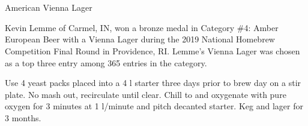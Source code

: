 \part{\styleviennalager}

\begin{recipie}{American Vienna Lager}

\begin{aboutblock}
Kevin Lemme of Carmel, IN, won a bronze medal in Category \#4: Amber European Beer with
a Vienna Lager during the 2019 National Homebrew Competition Final Round in Providence,
RI. Lemme's Vienna Lager was chosen as a top three entry among 365 entries in the category.
\end{aboutblock}


\begin{methodandtiming}
 
\begin{mashsteps}
\end{mashsteps}

\begin{fermentationsteps}
\end{fermentationsteps}

\begin{directions}
Use 4 yeast packs placed into a 4 l starter three days prior to brew day on a stir plate.
No mash out, recirculate until clear. Chill to  and oxygenate with pure oxygen
for 3 minutes at 1 l/minute and pitch decanted starter. Keg and lager for 3 months.
\end{directions}

\end{methodandtiming}

\begin{ingredientsblock}

\begin{malts}
\end{malts}

\begin{hops}
\end{hops}

\begin{yeasts}
\end{yeasts}

\end{ingredientsblock}

\end{recipie}
